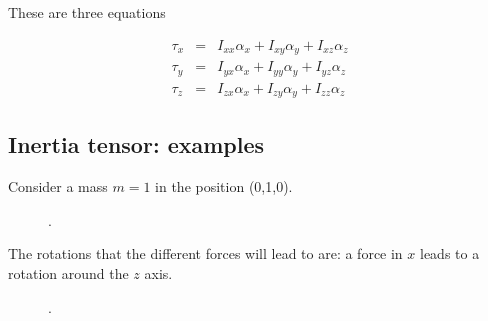 These are three equations 

\begin{eqnarray}
\tau_x &=& I_{xx}\alpha_x + I_{xy}\alpha_y + I_{xz}\alpha_z\\
\tau_y &=& I_{yx}\alpha_x + I_{yy}\alpha_y + I_{yz}\alpha_z\\
\tau_z &=& I_{zx}\alpha_x + I_{zy}\alpha_y + I_{zz}\alpha_z
\end{eqnarray}


\subsection{Inertia tensor: examples}

Consider a mass $m=1$ in the position (0,1,0). 


\begin{figure}
  \begin{center}
  \end{center}
  \caption[]{.}
  \label{fig:tensor12}
\end{figure}


The rotations that the different forces will lead to are: a force in $x$ leads to a rotation around the $z$ axis.  

\begin{figure}
  \begin{center}
  \end{center}
  \caption[]{.}
  \label{fig:tensor13}
\end{figure}

